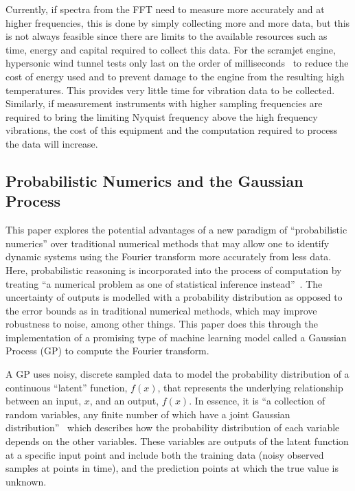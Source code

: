 \documentclass[12pt]{article}
\begin{document}
    Currently, if spectra from the FFT need to measure more accurately and at higher frequencies, this is done by simply collecting more and more data, but this is not always feasible since there are limits to the available resources such as time, energy and capital required to collect this data.
    For the scramjet engine, hypersonic wind tunnel tests only last on the order of milliseconds~\cite{Mec463} to reduce the cost of energy used and to prevent damage to the engine from the resulting high temperatures.
    This provides very little time for vibration data to be collected.
    Similarly, if measurement instruments with higher sampling frequencies are required to bring the limiting Nyquist frequency above the high frequency vibrations, the cost of this equipment and the computation required to process the data will increase.

    \subsection{Probabilistic Numerics and the Gaussian Process}
    This paper explores the potential advantages of a new paradigm of ``probabilistic numerics'' over traditional numerical methods that may allow one to identify dynamic systems using the Fourier transform more accurately from less data.
    Here, probabilistic reasoning is incorporated into the process of computation by treating ``a numerical problem as one of statistical inference instead''~\cite{ProbabilisticNumerics2023}.
    The uncertainty of outputs is modelled with a probability distribution as opposed to the error bounds as in traditional numerical methods, which may improve robustness to noise, among other things.
    This paper does this through the implementation of a promising type of machine learning model called a Gaussian Process (GP) to compute the Fourier transform.

    A GP uses noisy, discrete sampled data to model the probability distribution of a continuous ``latent'' function, $f(x)$, that represents the underlying relationship between an input, $x$, and an output, $f(x)$.
    In essence, it is ``a collection of random variables, any finite number of which have a joint Gaussian distribution''~\cite{rasmussen2006gaussian} which describes how the probability distribution of each variable depends on the other variables.
    These variables are outputs of the latent function at a specific input point and include both the training data (noisy observed samples at points in time), and the prediction points at which the true value is unknown.
\end{document}
